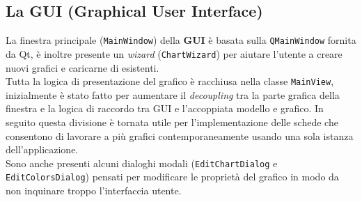 \subsection[GUI]{La GUI (Graphical User Interface)}
La finestra principale (\texttt{MainWindow}) della \textbf{GUI} è basata sulla \texttt{QMainWindow} fornita da Qt, è
inoltre presente un \textit{wizard} (\texttt{ChartWizard}) per aiutare l'utente a creare nuovi grafici e caricarne di
esistenti.\\
Tutta la logica di presentazione del grafico è racchiusa nella classe \texttt{MainView}, inizialmente è stato fatto per
aumentare il \textit{decoupling} tra la parte grafica della finestra e la logica di raccordo tra GUI e l'accoppiata
modello e grafico.
In seguito questa divisione è tornata utile per l'implementazione delle schede che consentono di lavorare a più
grafici contemporaneamente usando una sola istanza dell'applicazione.\\
Sono anche presenti alcuni dialoghi modali (\texttt{EditChartDialog} e \texttt{EditColorsDialog}) pensati per
modificare le proprietà del grafico in modo da non inquinare troppo l'interfaccia utente.


